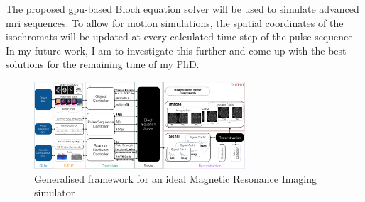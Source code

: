 \hfill

The proposed \ac{gpu}-based Bloch equation solver will be used to simulate advanced \ac{mri} sequences.
To allow for motion simulations, the spatial coordinates of the isochromats will be updated at every calculated time step of the pulse sequence.
In my future work, I am to investigate this further and come up with the best solutions for the remaining time of my PhD.


\begin{figure}[ht]
    \centering
    \includegraphics[angle=90,width=0.7\textwidth, keepaspectratio]{images/mri/globalFramework}
    \caption{Generalised framework for an ideal Magnetic Resonance Imaging simulator}
    \label{fig:globalFramework}
\end{figure}